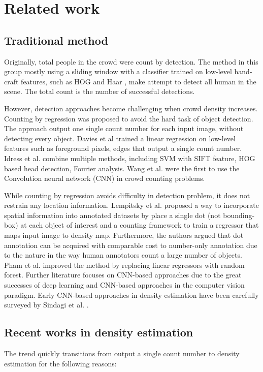 \section{Related work} \label{sec:related}
\subsection{Traditional method}
Originally, total people in the crowd were count by detection. The method in this group mostly using a sliding window with a classifier trained on low-level hand-craft features, such as HOG \cite{dalal2005histograms} and Haar \cite{lin2001estimation}, make attempt to detect all human in the scene. The total count is the number of successful detections.

However, detection approaches become challenging when crowd density increases. Counting by regression was proposed to avoid the hard task of object detection. The approach output one single count number for each input image, without detecting every object. Davies et al \cite{davies1995crowd} trained a linear regression on low-level features such as foreground pixels, edges that output a single count number. Idress et al. \cite{idrees2013multi} combine multiple methods, including SVM with SIFT feature, HOG based head detection, Fourier analysis. Wang et al. \cite{wang2015deep} were the first to use the Convolution neural network (CNN) in crowd counting problems.

While counting by regression avoids difficulty in detection problem, it does not restrain any location information. Lempitsky et al. \cite{lempitsky2010learning} proposed a way to incorporate spatial information into annotated datasets by place a single dot (not bounding-box) at each object of interest and a counting framework to train a regressor that maps input image to density map. Furthermore, the authors argued that dot annotation can be acquired with comparable cost to number-only annotation due to the nature in the way human annotators count a large number of objects. Pham et al. \cite{7410729} improved the method by replacing linear regressors with random forest. Further literature focuses on CNN-based approaches due to the great successes of deep learning and CNN-based approaches in the computer vision paradigm. Early CNN-based approaches in density estimation have been carefully surveyed by Sindagi et al. \cite{SINDAGI20183}.

\subsection{Recent works in density estimation}
The trend quickly transitions from output a single count number to density estimation for the following reasons: 


